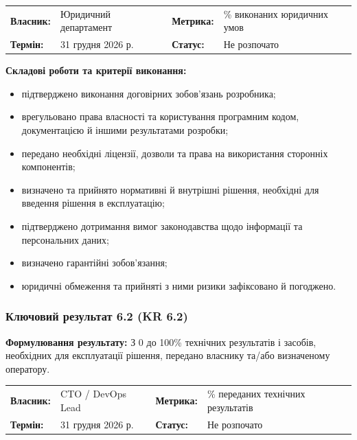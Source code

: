 \documentclass{article}
\begin{document}
\noindent\begin{tabular}{@{}p{2.2cm}p{4.5cm}p{2.2cm}p{4.5cm}@{}}
\toprule
\textbf{Власник:} & Юридичний департамент & \textbf{Метрика:} & \% виконаних юридичних умов \\
\textbf{Термін:} & 31 грудня 2026 р. & \textbf{Статус:} & Не розпочато \\
\bottomrule
\end{tabular}

\vspace{10pt}
\textbf{Складові роботи та критерії виконання:}
\begin{itemize}
    \item підтверджено виконання договірних зобов’язань розробника;
    \item врегульовано права власності та користування програмним кодом, документацією й іншими результатами розробки;
    \item передано необхідні ліцензії, дозволи та права на використання сторонніх компонентів;
    \item визначено та прийнято нормативні й внутрішні рішення, необхідні для введення рішення в експлуатацію;
    \item підтверджено дотримання вимог законодавства щодо інформації та персональних даних;
    \item визначено гарантійні зобов’язання;
    \item юридичні обмеження та прийняті з ними ризики зафіксовано й погоджено.
\end{itemize}

\subsubsection{Ключовий результат 6.2 (KR 6.2)}

\textbf{Формулювання результату:} З 0 до 100\% технічних результатів і засобів, необхідних для експлуатації рішення, передано власнику та/або визначеному оператору.

\noindent\begin{tabular}{@{}p{2.2cm}p{4.5cm}p{2.2cm}p{4.5cm}@{}}
\toprule
\textbf{Власник:} & CTO / DevOps Lead & \textbf{Метрика:} & \% переданих технічних результатів \\
\textbf{Термін:} & 31 грудня 2026 р. & \textbf{Статус:} & Не розпочато \\
\bottomrule
\end{tabular}
\end{document}
